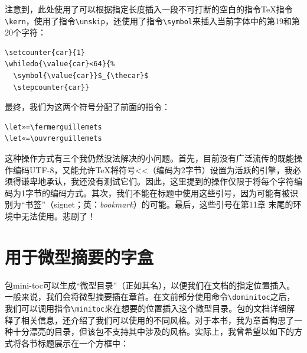注意到，此处使用了可以根据指定长度插入一段不可打断的空白的指令\TeX 指令\verb|\kern|，使用了指令\verb|\unskip|，还使用了指令\verb|\symbol|来插入当前字体中的第19和第20个字符：

\begin{codelist}[10.10]{
\setcounter{car}{1}
 \selectfont
{}
}\begin{verbatim}
\setcounter{car}{1}
\whiledo{\value{car}<64}{%
  \symbol{\value{car}}$_{\thecar}$
  \stepcounter{car}}
\end{verbatim}
\end{codelist}

最终，我们为这两个符号分配了前面的指令：

\begin{dmd}
\begin{verbatim}
\let»=\fermerguillemets
\let«=\ouvrerguillemets
\end{verbatim}
\end{dmd}

\begin{qquestion}
这种操作方式有三个我仍然没法解决的小问题。首先，目前没有广泛流传的既能操作编码UTF-8，又能允许\TeX 将符号<<（编码为2字节）设置为活跃的引擎，我必须得谦卑地承认，我还没有测试它们。因此，这里提到的操作仅限于将每个字符编码为1字节的编码方式。其次，我们不能在标题中使用这些引号，因为可能有被识别为“书签”（signet；英：\emph{bookmark}）的可能。最后，这些引号在第11章%
末尾的环境中无法使用。悲剧了！
\end{qquestion}

\section{用于微型摘要的字盒}

包\textsf{mini-toc}可以生成“微型目录”（正如其名），以便我们在文档的指定位置插入。一般来说，我们会将微型摘要插在章首。在文前部分使用命令\verb|\dominitoc|之后，我们可以调用指令\verb|\minitoc|来在想要的位置插入这个微型目录。包的文档详细解释了相关信息，还介绍了我们可以使用的不同风格。对于本书，我为章首构思了一种十分漂亮的目录，但该包不支持其中涉及的风格。实际上，我曾希望以如下的方式将各节标题展示在一个方框中：

\newsavebox{\boitetitre}
\newlength{\tempdim}
\newlength{\largeurboitetitre}
\newlength{\hauteurboitetitre}
\newlength{\largeurtitre}

\newcommand{\espacetitre}{0.6}
\newcommand{\decalagetitreg}{1}
\newcommand{\decalagetitred}{5}

